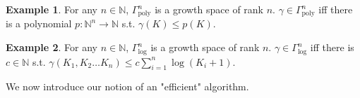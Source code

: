 \documentclass{article}
\numberwithin{equation}{section}
\theoremstyle{definition}
\newtheorem{example}{Example}[section]
\theoremstyle{plain}
\newcommand{\Nats}{\mathbb{N}}
\begin{document}
\begin{example}

For any $n \in \Nats$, $\Gamma_{\text{poly}}^n$ is a growth space of rank $n$. $\gamma \in \Gamma_{\text{poly}}^n$ iff there is a polynomial $p: \Nats^n \rightarrow \Nats$ s.t. $\gamma(K) \leq p(K)$.

\end{example}

\begin{example}

For any $n \in \Nats$, $\Gamma_{\text{log}}^n$ is a growth space of rank $n$. $\gamma \in \Gamma_{\text{log}}^n$ iff there is $c \in \Nats$ s.t. $\gamma(K_1, K_2 \ldots K_n) \leq c \sum_{i=1}^n \log(K_i+1)$.

\end{example}

We now introduce our notion of an "efficient" algorithm.
\end{document}
